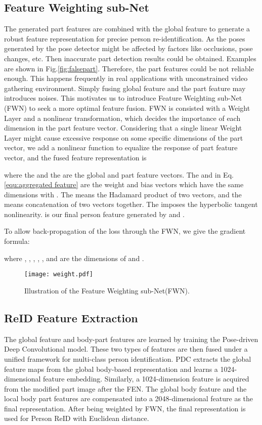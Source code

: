 \documentclass[10pt,twocolumn,letterpaper]{article}
\begin{document}
\subsection{Feature Weighting sub-Net}
The generated part features are combined with the global feature to generate a robust feature representation for precise person re-identification. As the poses generated by the pose detector might be affected by factors like occlusions, pose changes, etc. Then inaccurate part detection results could be obtained. Examples are shown in Fig.\ref{fig:falsepart}. Therefore, the part features could be not reliable enough. This happens frequently in real applications with unconstrained video gathering environment. Simply fusing global feature and the part feature may introduces noises. This motivates us to introduce Feature Weighting sub-Net (FWN) to seek a more optimal feature fusion. FWN is consisted with a Weight Layer and a nonlinear transformation, which decides the importance of each dimension in the part feature vector. Considering that a single linear Weight Layer might cause excessive response on some specific dimensions of the part vector, we add a nonlinear function to equalize the response of part feature vector, and the fused feature representation is

where the  and the  are the global and part feature vectors.
The  and  in Eq. \ref{equ:aggregated feature} are the weight and bias vectors which have the same dimensions with .
The  means the Hadamard product of two vectors, and the  means concatenation of two vectors together. The  imposes the hyperbolic tangent nonlinearity.
 is our final person feature generated by  and .


To allow back-propagation of the loss through the FWN, we give the gradient formula:



where , , ,
, ,
  and  are the dimensions of  and .

\begin{figure}[t]
\centering \texttt{[image: weight.pdf]}\\
\vspace{-2mm}
\caption{ Illustration of the Feature Weighting sub-Net(FWN).}
\vspace{-5mm}
\label{fig:PDFWS}\end{figure}



\subsection{ReID Feature Extraction}
The global feature and body-part features are learned by training the Pose-driven Deep Convolutional model. These two types of features are then fused under a unified framework for multi-class person identification. PDC extracts the global feature maps from the global body-based representation and learns a 1024-dimensional feature embedding. Similarly, a 1024-dimension feature is acquired from the modified part image after the FEN. The global body feature and the local body part features are compensated into a 2048-dimensional feature as the final representation. After being weighted by FWN, the final representation is used for Person ReID with Euclidean distance.
\end{document}
